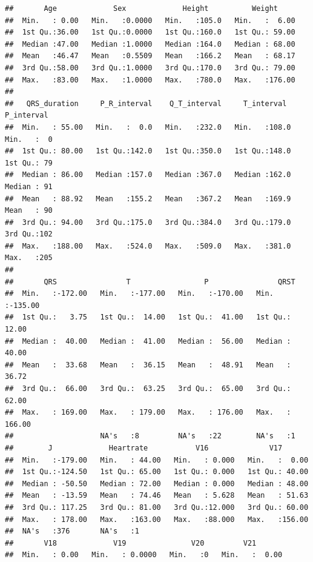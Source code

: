 \documentclass[
]{article}
\begin{document}
\begin{verbatim}
##       Age             Sex             Height          Weight      
##  Min.   : 0.00   Min.   :0.0000   Min.   :105.0   Min.   :  6.00  
##  1st Qu.:36.00   1st Qu.:0.0000   1st Qu.:160.0   1st Qu.: 59.00  
##  Median :47.00   Median :1.0000   Median :164.0   Median : 68.00  
##  Mean   :46.47   Mean   :0.5509   Mean   :166.2   Mean   : 68.17  
##  3rd Qu.:58.00   3rd Qu.:1.0000   3rd Qu.:170.0   3rd Qu.: 79.00  
##  Max.   :83.00   Max.   :1.0000   Max.   :780.0   Max.   :176.00  
##                                                                   
##   QRS_duration     P_R_interval    Q_T_interval     T_interval      P_interval 
##  Min.   : 55.00   Min.   :  0.0   Min.   :232.0   Min.   :108.0   Min.   :  0  
##  1st Qu.: 80.00   1st Qu.:142.0   1st Qu.:350.0   1st Qu.:148.0   1st Qu.: 79  
##  Median : 86.00   Median :157.0   Median :367.0   Median :162.0   Median : 91  
##  Mean   : 88.92   Mean   :155.2   Mean   :367.2   Mean   :169.9   Mean   : 90  
##  3rd Qu.: 94.00   3rd Qu.:175.0   3rd Qu.:384.0   3rd Qu.:179.0   3rd Qu.:102  
##  Max.   :188.00   Max.   :524.0   Max.   :509.0   Max.   :381.0   Max.   :205  
##                                                                                
##       QRS                T                 P                QRST        
##  Min.   :-172.00   Min.   :-177.00   Min.   :-170.00   Min.   :-135.00  
##  1st Qu.:   3.75   1st Qu.:  14.00   1st Qu.:  41.00   1st Qu.:  12.00  
##  Median :  40.00   Median :  41.00   Median :  56.00   Median :  40.00  
##  Mean   :  33.68   Mean   :  36.15   Mean   :  48.91   Mean   :  36.72  
##  3rd Qu.:  66.00   3rd Qu.:  63.25   3rd Qu.:  65.00   3rd Qu.:  62.00  
##  Max.   : 169.00   Max.   : 179.00   Max.   : 176.00   Max.   : 166.00  
##                    NA's   :8         NA's   :22        NA's   :1        
##        J             Heartrate           V16              V17        
##  Min.   :-179.00   Min.   : 44.00   Min.   : 0.000   Min.   :  0.00  
##  1st Qu.:-124.50   1st Qu.: 65.00   1st Qu.: 0.000   1st Qu.: 40.00  
##  Median : -50.50   Median : 72.00   Median : 0.000   Median : 48.00  
##  Mean   : -13.59   Mean   : 74.46   Mean   : 5.628   Mean   : 51.63  
##  3rd Qu.: 117.25   3rd Qu.: 81.00   3rd Qu.:12.000   3rd Qu.: 60.00  
##  Max.   : 178.00   Max.   :163.00   Max.   :88.000   Max.   :156.00  
##  NA's   :376       NA's   :1                                         
##       V18             V19               V20         V21        
##  Min.   : 0.00   Min.   : 0.0000   Min.   :0   Min.   :  0.00  

\end{verbatim}
\end{document}
